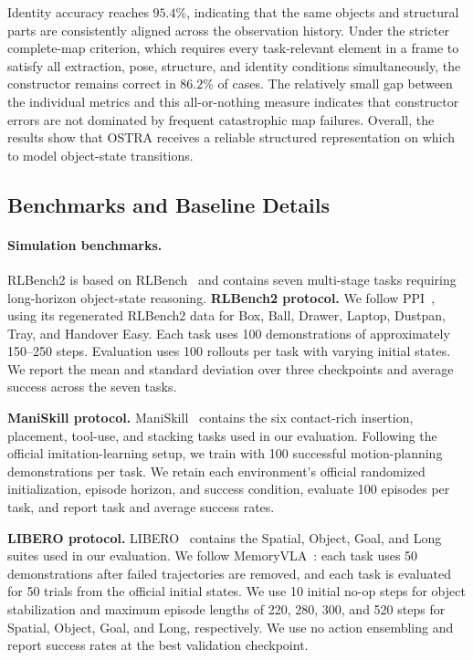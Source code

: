 Identity accuracy reaches $95.4\%$, indicating that the same objects and
structural parts are consistently aligned across the observation history.
Under the stricter complete-map criterion, which requires every task-relevant
element in a frame to satisfy all extraction, pose, structure, and identity
conditions simultaneously, the constructor remains correct in $86.2\%$ of
cases. The relatively small gap between the individual metrics and this
all-or-nothing measure indicates that constructor errors are not dominated by
frequent catastrophic map failures. Overall, the results show that OSTRA
receives a reliable structured representation on which to model object-state
transitions.

\subsection{Benchmarks and Baseline Details}
\label{app:benchmarks}

\paragraph{Simulation benchmarks.}
RLBench2 is based on RLBench~\citep{James2020RLBench} and contains seven
multi-stage tasks requiring long-horizon object-state reasoning.
\textbf{RLBench2 protocol.} We follow PPI~\citep{Yang2025PPI}, using its
regenerated RLBench2 data for Box, Ball, Drawer, Laptop, Dustpan, Tray, and
Handover Easy. Each task uses 100 demonstrations of approximately 150--250
steps. Evaluation uses 100 rollouts per task with varying initial states. We
report the mean and standard deviation over three checkpoints and average
success across the seven tasks.

\textbf{ManiSkill protocol.} ManiSkill~\citep{Gu2023ManiSkill2} contains the
six contact-rich insertion, placement, tool-use, and stacking tasks used in our
evaluation. Following the official imitation-learning setup, we train with 100
successful motion-planning demonstrations per task. We retain each
environment's official randomized initialization, episode horizon, and success
condition, evaluate 100 episodes per task, and report task and average success
rates.

\textbf{LIBERO protocol.} LIBERO~\citep{liu2023libero} contains the Spatial,
Object, Goal, and Long suites used in our evaluation. We follow
MemoryVLA~\citep{shi2025memoryvla}: each task uses 50 demonstrations after
failed trajectories are removed, and each task is evaluated for 50 trials from
the official initial states. We use 10 initial no-op steps for object
stabilization and maximum episode lengths of 220, 280, 300, and 520 steps for
Spatial, Object, Goal, and Long, respectively. We use no action ensembling and
report success rates at the best validation checkpoint.

